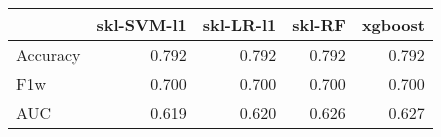 \begin{tabular}{lrrrr}
\toprule
{} &  skl-SVM-l1 &  skl-LR-l1 &  skl-RF &  xgboost \\
\midrule
Accuracy &       0.792 &      0.792 &   0.792 &    0.792 \\
F1w      &       0.700 &      0.700 &   0.700 &    0.700 \\
AUC      &       0.619 &      0.620 &   0.626 &    0.627 \\
\bottomrule
\end{tabular}
